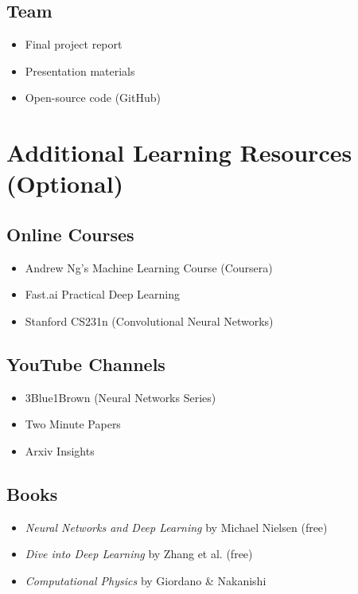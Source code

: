 \documentclass[11pt,a4paper]{article}
\begin{document}
\subsection{Team}
\begin{itemize}[noitemsep]
    \item Final project report
    \item Presentation materials
    \item Open-source code (GitHub)
\end{itemize}

\section{Additional Learning Resources (Optional)}

\subsection{Online Courses}
\begin{itemize}[noitemsep]
    \item Andrew Ng's Machine Learning Course (Coursera)
    \item Fast.ai Practical Deep Learning
    \item Stanford CS231n (Convolutional Neural Networks)
\end{itemize}

\subsection{YouTube Channels}
\begin{itemize}[noitemsep]
    \item 3Blue1Brown (Neural Networks Series)
    \item Two Minute Papers
    \item Arxiv Insights
\end{itemize}

\subsection{Books}
\begin{itemize}[noitemsep]
    \item \textit{Neural Networks and Deep Learning} by Michael Nielsen (free)
    \item \textit{Dive into Deep Learning} by Zhang et al. (free)
    \item \textit{Computational Physics} by Giordano \& Nakanishi
\end{itemize}
\end{document}
